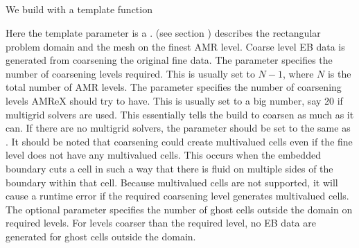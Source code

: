 \documentclass[letterpaper,10pt,english]{sphinxmanual}
\begin{document}
\subsection{}
\label{\detokenize{EB:eb2-indexspace}}
\sphinxAtStartPar
We build  with a template function

\begin{sphinxVerbatim}[commandchars=\\\{\}]
  
       
                  
                  
                    
\end{sphinxVerbatim}

\sphinxAtStartPar
Here the template parameter is a .  (see
section {\hyperref[\detokenize{Basics:sec-basics-geom}]{}}) describes the rectangular problem domain and the
mesh on the finest AMR level. Coarse level EB data is generated from coarsening
the original fine data. The  parameter
specifies the number of coarsening levels required. This is usually set to
\(N-1\), where \(N\) is the total number of AMR levels. The  parameter specifies the number of coarsening levels AMReX
should try to have. This is usually set to a big number, say 20 if multigrid
solvers are used. This essentially tells the build to coarsen as much as it can.
If there are no multigrid solvers, the parameter should be set to the same as
. It should be noted that coarsening could
create multi\sphinxhyphen{}valued cells even if the fine level does not have any multi\sphinxhyphen{}valued
cells. This occurs when the embedded boundary cuts a cell in such a way that
there is fluid on multiple sides of the boundary within that cell. Because
multi\sphinxhyphen{}valued cells are not supported, it will cause a runtime error if the
required coarsening level generates multi\sphinxhyphen{}valued cells. The optional  parameter specifies the number of ghost cells outside the domain on
required levels. For levels coarser than the required level, no EB data are
generated for ghost cells outside the domain.
\end{document}
